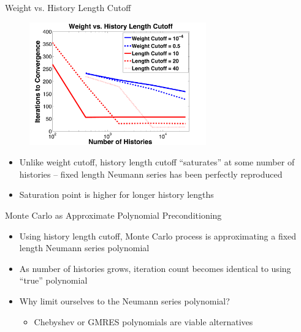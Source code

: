 \documentclass{beamer}
\begin{document}
\begin{frame}{Weight vs. History Length Cutoff}
\begin{figure}
  \centering
  \includegraphics[width=3in]{WtVsLength}
\end{figure}
\begin{itemize}
  \item Unlike weight cutoff, history length cutoff ``saturates'' at some
    number of histories -- fixed length Neumann series has been perfectly
    reproduced
  \item Saturation point is higher for longer history lengths
\end{itemize}
\end{frame}
\begin{frame}{Monte Carlo as Approximate Polynomial Preconditioning}
  \begin{itemize}
    \item Using history length cutoff, Monte Carlo process is approximating
      a fixed length Neumann series polynomial
    \vfill
    \item As number of histories grows, iteration count becomes identical to
      using ``true'' polynomial
    \vfill
    \item Why limit ourselves to the Neumann series polynomial?
      \begin{itemize}
        \item Chebyshev or GMRES polynomials are viable alternatives
      \end{itemize}
  \end{itemize}
\end{frame}
\end{document}
